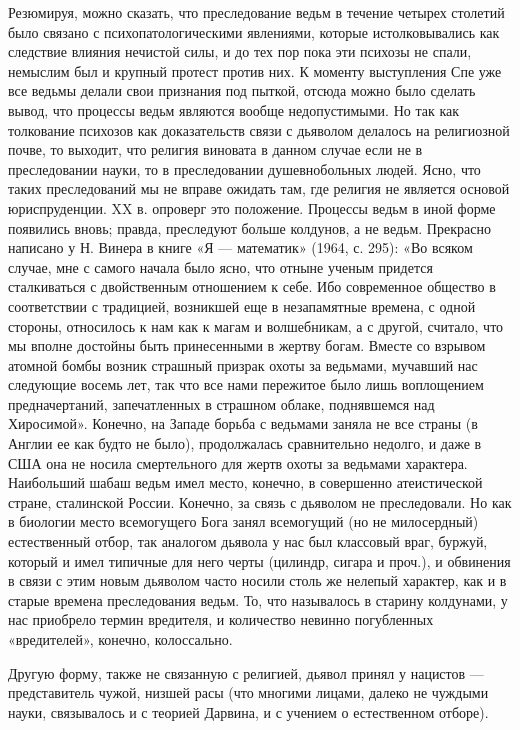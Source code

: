 Резюмируя, можно  сказать, что  преследование ведьм в  течение четырех
столетий  было  связано   с  психопатологическими  явлениями,  которые
истолковывались как следствие влияния нечистой силы, и до тех пор пока
эти психозы  не спали, немыслим  был и  крупный протест против  них. К
моменту  выступления Спе  уже  все ведьмы  делали  свои признания  под
пыткой, отсюда можно  было сделать вывод, что  процессы ведьм являются
вообще недопустимыми. Но так как толкование психозов как доказательств
связи  с  дьяволом делалось  на  религиозной  почве, то  выходит,  что
религия виновата в  данном случае если не в преследовании  науки, то в
преследовании душевнобольных  людей. Ясно, что таких  преследований мы
не вправе ожидать там, где  религия не является основой юриспруденции.
XX в.  опроверг это положение.  Процессы ведьм в иной  форме появились
вновь;  правда,  преследуют больше  колдунов,  а  не ведьм.  Прекрасно
написано  у Н.  Винера  в  книге «Я  ---  математик»  (1964, с.  295):
«Во  всяком  случае,  мне  с  самого  начала  было  ясно,  что  отныне
ученым  придется сталкиваться  с двойственным  отношением к  себе. Ибо
современное  общество  в соответствии  с  традицией,  возникшей еще  в
незапамятные времена, с одной стороны, относилось  к нам как к магам и
волшебникам,  а  с  другой,  считало,  что  мы  вполне  достойны  быть
принесенными в  жертву богам. Вместе  со взрывом атомной  бомбы возник
страшный призрак охоты за ведьмами, мучавший нас следующие восемь лет,
так  что  все нами  пережитое  было  лишь воплощением  предначертаний,
запечатленных в страшном облаке,  поднявшемся над Хиросимой». Конечно,
на Западе  борьба с  ведьмами заняла  не все страны  (в Англии  ее как
будто не было), продолжалась сравнительно недолго, и даже в США она не
носила смертельного для жертв  охоты за ведьмами характера. Наибольший
шабаш ведьм  имел место,  конечно, в совершенно  атеистической стране,
сталинской России.  Конечно, за связь  с дьяволом не  преследовали. Но
как  в  биологии  место  всемогущего  Бога  занял  всемогущий  (но  не
милосердный)  естественный  отбор,  так  аналогом дьявола  у  нас  был
классовый  враг,  буржуй,  который  и имел  типичные  для  него  черты
(цилиндр, сигара и  проч.), и обвинения в связи с  этим новым дьяволом
часто  носили  столь же  нелепый  характер,  как  и в  старые  времена
преследования  ведьм.  То,  что  называлось  в  старину  колдунами,  у
нас  приобрело  термин  вредителя, и  количество  невинно  погубленных
«вредителей», конечно, колоссально.

Другую форму, также не связанную  с религией, дьявол принял у нацистов
--- представитель  чужой, низшей расы  (что многими лицами,  далеко не
чуждыми  науки,  связывалось  и  с  теорией Дарвина,  и  с  учением  о
естественном отборе).

